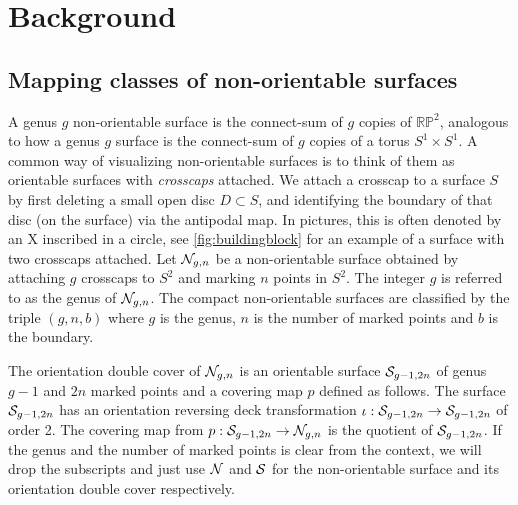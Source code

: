 \section{Background}
\label{sec:background}

\subsection{Mapping classes of non-orientable surfaces}
\label{sec:mapping-classes-non}

A genus $g$ non-orientable surface is the connect-sum of $g$ copies of
$\mathbb{RP}^2$, analogous to how a genus $g$ surface is the connect-sum of $g$ copies of a torus
$S^1 \times S^1$.  A common way of visualizing non-orientable surfaces is to think of them as orientable
surfaces with \emph{crosscaps} attached. We attach a crosscap to a surface $S$ by first deleting a small open disc $D\subset S$, and
identifying the boundary of that disc (on the surface) via the antipodal map. In pictures, this is often denoted by
an X inscribed in a circle, see \autoref{fig:buildingblock} for an example of a surface with two crosscaps
attached.  Let $\mathcal{N}_{g,n}$ be a non-orientable surface obtained by attaching $g$ crosscaps to $S^2$ and marking $n$ points in $S^2$.  The integer $g$ is referred to as the genus of $\mathcal{N}_{g,n}$.  The compact non-orientable surfaces are classified by the triple $(g,n,b)$ where $g$ is the genus, $n$ is the number of marked points and $b$ is the boundary.  

 The orientation double cover of $\mathcal{N}_{g,n}$ is an orientable surface $\mathcal{S}_{g-1, 2n}$ of genus $g-1$ and $2n$ marked points and a covering map $p$ defined as follows. The surface $\mathcal{S}_{g-1,2n}$ has an orientation reversing deck transformation $\iota: \mathcal{S}_{g-1, 2n} \to \mathcal{S}_{g-1,
  2n}$ of order 2. The covering map from $p:\mathcal{S}_{g-1,2n}\to \mathcal{N}_{g,n}$ is the quotient of $\mathcal{S}_{g-1,2n}$. If the genus and the
number of marked points is clear from the context, we will drop the subscripts and just use
$\mathcal{N}$ and $\mathcal{S}$ for the non-orientable surface and its orientation double cover respectively.

